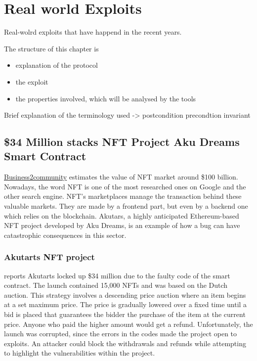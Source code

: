 \chapter{Real world Exploits}
\label{ch:Exploits}
Real-wolrd exploits that have happend in the recent years.

The structure of this chapter is 
\begin{itemize}
    \item explanation of the protocol
    \item the exploit 
    \item the properties involved, which will be analysed by the tools
\end{itemize}

Brief explanation of the terminology used -> postcondition precondtion invariant


\section{\$34 Million stacks NFT Project Aku Dreams Smart Contract}
\label{sec:Exploits:AkuDreams}
\href{https://www.business2community.com/nft-news/nft-market-size-how-to-track-02467120}{Business2community} estimates the value of NFT market around \$100 billion.
Nowadays, the word NFT is one of the most researched ones on Google and the other search engine.
NFT's marketplaces manage the transaction behind these valuable markets. 
They are made by a frontend part, but even by a backend one which relies on the blockchain. 
Akutars, a highly anticipated Ethereum-based NFT project developed by Aku Dreams, is an example of how a bug can have catastrophic consequences in this sector. 

\subsection{Akutarts NFT project}
\label{sec:AkuDreams:Akutars}
\cite{Aku} reports Akutarts locked up \$34 million due to the faulty code of the smart contract.
The launch contained 15,000  NFTs and was based on the Dutch auction. This strategy involves a descending price auction where an item begins at a set maximum price. 
The price is gradually lowered over a fixed time until a bid is placed that guarantees the bidder the purchase of the item at the current price. 
Anyone who paid the higher amount would get a refund.
Unfortunately, the launch was corrupted, since the errors in the codes made the project open to exploits. 
An attacker could block the withdrawals and refunds while attempting to highlight the vulnerabilities within the project.

